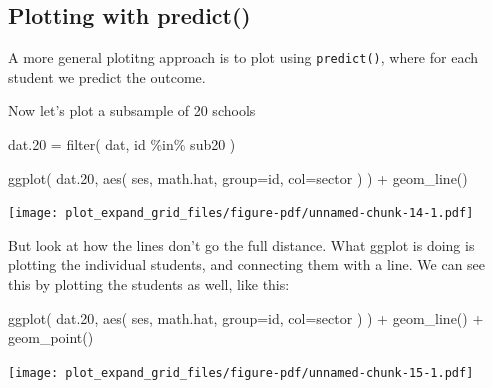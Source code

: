\documentclass[
  letterpaper,
  DIV=11,
  numbers=noendperiod]{scrreprt}
\newenvironment{Shaded}{}{}
\newcommand{\AttributeTok}[1]{\textcolor[rgb]{0.49,0.56,0.16}{#1}}
\newcommand{\FloatTok}[1]{\textcolor[rgb]{0.25,0.63,0.44}{#1}}
\newcommand{\FunctionTok}[1]{\textcolor[rgb]{0.02,0.16,0.49}{#1}}
\newcommand{\NormalTok}[1]{#1}
\newcommand{\OtherTok}[1]{\textcolor[rgb]{0.00,0.44,0.13}{#1}}
\newcommand{\SpecialCharTok}[1]{\textcolor[rgb]{0.25,0.44,0.63}{#1}}
\begin{document}
\subsection{Plotting with predict()}\label{plotting-with-predict}

A more general plotitng approach is to plot using \texttt{predict()},
where for each student we predict the outcome.

\begin{Shaded}
\end{Shaded}

Now let's plot a subsample of 20 schools

\begin{Shaded}
\begin{Highlighting}[]
\NormalTok{dat}\FloatTok{.20} \OtherTok{=} \FunctionTok{filter}\NormalTok{( dat, id }\SpecialCharTok{\%in\%}\NormalTok{ sub20 )}

\FunctionTok{ggplot}\NormalTok{( dat}\FloatTok{.20}\NormalTok{, }\FunctionTok{aes}\NormalTok{( ses, math.hat, }\AttributeTok{group=}\NormalTok{id, }\AttributeTok{col=}\NormalTok{sector ) ) }\SpecialCharTok{+}
  \FunctionTok{geom\_line}\NormalTok{()}
\end{Highlighting}
\end{Shaded}

\texttt{[image: plot\_expand\_grid\_files/figure-pdf/unnamed-chunk-14-1.pdf]}

But look at how the lines don't go the full distance. What ggplot is
doing is plotting the individual students, and connecting them with a
line. We can see this by plotting the students as well, like this:

\begin{Shaded}
\begin{Highlighting}[]
\FunctionTok{ggplot}\NormalTok{( dat}\FloatTok{.20}\NormalTok{, }\FunctionTok{aes}\NormalTok{( ses, math.hat, }\AttributeTok{group=}\NormalTok{id, }\AttributeTok{col=}\NormalTok{sector ) ) }\SpecialCharTok{+}
  \FunctionTok{geom\_line}\NormalTok{() }\SpecialCharTok{+}
  \FunctionTok{geom\_point}\NormalTok{()}
\end{Highlighting}
\end{Shaded}

\texttt{[image: plot\_expand\_grid\_files/figure-pdf/unnamed-chunk-15-1.pdf]}
\end{document}

